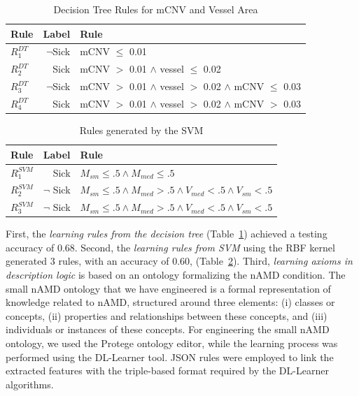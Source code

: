 \documentclass[conference]{IEEEtran}
\begin{document}
\begin{table}%
    \centering
    \caption{Decision Tree Rules for mCNV and Vessel Area}
    \label{tab:decision_tree_rules}
    \begin{tabular}{lrl}
        \textbf{Rule} & \textbf{Label} & \textbf{Rule} \\ \hline
        $R^{DT}_1$ & $\neg$Sick & mCNV $\leq$ 0.01 \\
        $R^{DT}_2$ & Sick & mCNV $>$ 0.01 $\land$ vessel $\leq$ 0.02 \\
        $R^{DT}_3$ & $\neg$Sick & mCNV $>$ 0.01 $\land$ vessel $>$ 0.02 $\land$ mCNV $\leq$ 0.03 \\
        $R^{DT}_4$ & Sick & mCNV $>$ 0.01 $\land$ vessel $>$ 0.02 $\land$ mCNV $>$ 0.03 \\ \hline
    \end{tabular}
\end{table}
\begin{table}%
    \centering
    \caption{Rules generated by the SVM}
    \begin{tabular}{lrl}
        \textbf{Rule} & \textbf{Label} & \textbf{Rule} \\
        \hline
        $R^{SVM}_1$ & Sick & $M_{sm} \leq .5 \wedge M_{med} \leq .5$ \\
        $R^{SVM}_2$ & $\neg$ Sick & $M_{sm} \leq .5 \wedge M_{med} > .5 \wedge V_{med} < .5 \wedge V_{sm} < .5$ \\
        $R^{SVM}_3$ & $\neg$ Sick & $M_{sm} \leq .5 \wedge M_{med} > .5 \wedge V_{med} < .5 \wedge V_{sm} < .5$ \\
    \end{tabular}
    \label{tab:svm_rules}
\end{table}


First, the \textit{learning rules from the decision tree} (Table~\ref{tab:decision_tree_rules}) achieved a testing accuracy of 0.68. %
Second, the \textit{learning rules from SVM} using the RBF kernel generated 3 rules, with an accuracy of 0.60, (Table~\ref{tab:svm_rules}). 
Third, \textit{learning axioms in description logic} is based on an ontology formalizing the nAMD condition. The small nAMD ontology that we have engineered is a formal representation of knowledge related to nAMD, structured around three elements: 
(i) classes or concepts, (ii) properties and relationships between these concepts, and (iii) individuals or instances of these concepts. 
For engineering the small nAMD ontology, we used the Protege ontology editor, while the learning process was performed using the DL-Learner tool. 
JSON rules were employed to link the extracted features with the triple-based format required by the DL-Learner algorithms.
\end{document}
